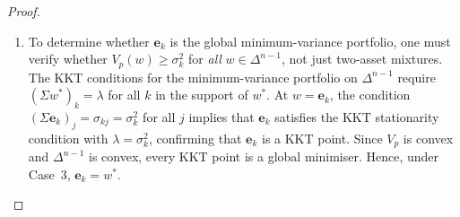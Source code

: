 \documentclass[12pt,openany]{book}
\newcommand{\bfw}{\mathbf{w}}
\newcommand{\bfe}{\mathbf{e}}
\numberwithin{equation}{chapter}
\theoremstyle{plain}
\theoremstyle{definition}
\theoremstyle{remark}
\def\bfw{w}%
\begin{document}
\begin{proof}
\begin{enumerate}
\begin{enumerate}
\begin{enumerate}
                        $V_p(\bfw_\varepsilon) \geq \sigma_k^2
                        = V_p(\bfe_k)$ for all $\varepsilon$.
                        In this sub-case, no improvement is possible
                        in the two-asset direction $(k,j)$.
                  \item To determine whether $\bfe_k$ is the global
                        minimum-variance portfolio, one must verify
                        whether $V_p(\bfw) \geq \sigma_k^2$ for
                        \emph{all} $\bfw \in \Delta^{n-1}$, not just
                        two-asset mixtures.  The KKT conditions for the
                        minimum-variance portfolio on $\Delta^{n-1}$
                        require $(\Sigma\bfw^*)_k = \lambda$ for all
                        $k$ in the support of $\bfw^*$.  At
                        $\bfw = \bfe_k$, the condition
                        $(\Sigma\bfe_k)_j = \sigma_{kj} = \sigma_k^2$
                        for all $j$ implies that $\bfe_k$ satisfies
                        the KKT stationarity condition with
                        $\lambda = \sigma_k^2$, confirming that
                        $\bfe_k$ is a KKT point.  Since $V_p$ is
                        convex and $\Delta^{n-1}$ is convex, every
                        KKT point is a global minimiser.
                        Hence, under Case~3, $\bfe_k = \bfw^*$.
                \end{enumerate}


\end{enumerate}
\end{enumerate}
\end{proof}
\end{document}
